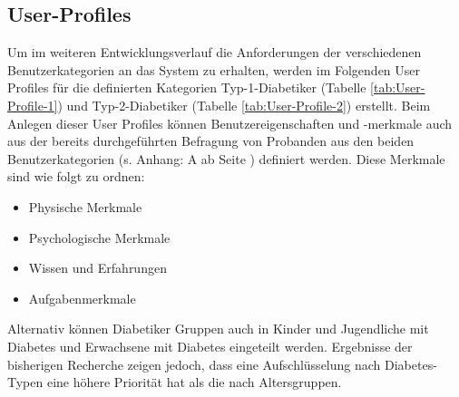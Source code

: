 	\subsection{User-Profiles}
	Um im weiteren Entwicklungsverlauf die Anforderungen der verschiedenen Benutzerkategorien an das System zu erhalten, werden im Folgenden User Profiles für die definierten Kategorien Typ-1-Diabetiker (Tabelle \ref{tab:User-Profile-1}) und Typ-2-Diabetiker (Tabelle \ref{tab:User-Profile-2}) erstellt. Beim Anlegen dieser User Profiles können Benutzereigenschaften und -merkmale auch aus der bereits durchgeführten Befragung von Probanden aus den beiden Benutzerkategorien (s. Anhang: A  ab Seite \pageref{section:Evaluation}) definiert werden. Diese Merkmale sind wie folgt zu ordnen:
	\begin{itemize}
		\item Physische Merkmale
		\item Psychologische Merkmale
		\item Wissen und Erfahrungen
		\item Aufgabenmerkmale
	\end{itemize}
	Alternativ können Diabetiker Gruppen auch in \glqq Kinder und Jugendliche mit Diabetes\grqq{} und \glqq Erwachsene mit Diabetes\grqq{} eingeteilt werden. Ergebnisse der bisherigen Recherche zeigen jedoch, dass eine Aufschlüsselung nach Diabetes-Typen eine höhere Priorität hat als die nach Altersgruppen. 
